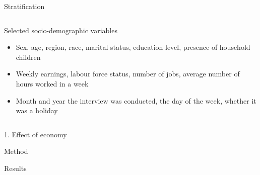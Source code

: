 \documentclass[final]{beamer}
\newcounter{acolumn}%
\def\autoheight{\vspace*{0pt}}%
\begin{document}
\begin{frame}
\begin{acolumns}[t]
\begin{column}{.24\linewidth}
\begin{block}{Stratification}
                \autoheight
               \end{block}
               
              \end{column}
               
              \begin{column}{.24\linewidth}
               \begin{block}{Selected socio-demographic variables}
                \begin{itemize}
                	\item Sex, age, region, race, marital status, education level, presence of household children
                	
                	\item Weekly earnings, labour force status, number of jobs, average number of hours worked in a week
                	
                	\item Month and year the interview was conducted, the day of the week, whether it was a holiday
                	
                \end{itemize}
                             
                \autoheight
               \end{block}
                  
              \end{column}
              
            \end{acolumns}
        
        
        \vfill
    
    \begin{acolumns}[t]
    
    \begin{column}{.48\linewidth}
    \begin{center}
   		\LARGE{1. Effect of economy}
    \end{center}
     \begin{block}{Method}
                
        
     \end{block}
     
     
     \begin{block}{Results}
                     
      \autoheight 
     \end{block}
     

\end{column}
\end{acolumns}
\end{frame}
\end{document}
